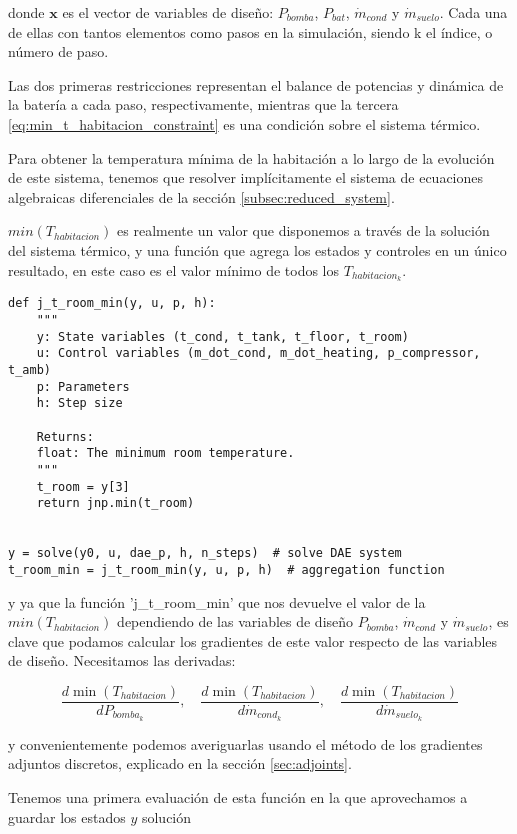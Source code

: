donde $\mathbf{x}$ es el vector de variables de diseño: $P_{bomba}$, $P_{bat}$,
$\dot{m}_{cond}$ y $\dot{m}_{suelo}$. Cada una de ellas con tantos elementos
como pasos en la simulación, siendo k el índice, o número de paso.

Las dos primeras restricciones representan el balance de potencias y dinámica
de la batería a cada paso, respectivamente, mientras que la tercera
\eqref{eq:min_t_habitacion_constraint} es una condición sobre el sistema
térmico.

Para obtener la temperatura mínima de la habitación a lo largo de la evolución
de este sistema, tenemos que resolver implícitamente el sistema de ecuaciones
algebraicas diferenciales de la sección \ref{subsec:reduced_system}.

$min(T_{habitacion})$ es realmente un valor que disponemos a través de la
solución del sistema térmico, y una función que agrega los estados y controles
en un único resultado, en este caso es el valor mínimo de todos los
$T_{habitacion_k}$.

\begin{verbatim}
def j_t_room_min(y, u, p, h):
    """
    y: State variables (t_cond, t_tank, t_floor, t_room)
    u: Control variables (m_dot_cond, m_dot_heating, p_compressor, t_amb)
    p: Parameters
    h: Step size

    Returns:
    float: The minimum room temperature.
    """
    t_room = y[3]
    return jnp.min(t_room)


y = solve(y0, u, dae_p, h, n_steps)  # solve DAE system
t_room_min = j_t_room_min(y, u, p, h)  # aggregation function
\end{verbatim}


y ya que la función 'j\_t\_room\_min' que nos devuelve el valor de la
$min(T_{habitacion})$ dependiendo de las variables de diseño $P_{bomba}$,
$\dot{m}_{cond}$ y $\dot{m}_{suelo}$, es clave que podamos calcular los
gradientes de este valor respecto de las variables de diseño. Necesitamos las
derivadas:

\begin{equation*}
  \frac{d \min(T_{habitacion})}{d P_{bomba_k}}, \quad \frac{d \min(T_{habitacion})}{d \dot{m}_{cond_k}}, \quad \frac{d \min(T_{habitacion})}{d \dot{m}_{suelo_k}}
\end{equation*}

y convenientemente podemos averiguarlas usando el método de los gradientes
adjuntos discretos, explicado en la sección \ref{sec:adjoints}.

Tenemos una primera evaluación de esta función en la que aprovechamos a guardar
los estados $y$ solución

